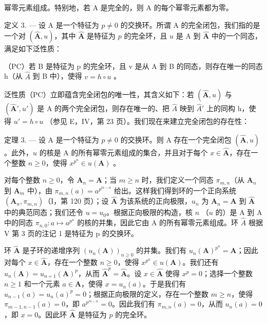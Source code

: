 幂零元素组成。特别地，若 A 是完全的，则 A 的每个幂零元素都为零。

定义 3. --- 设 A 是一个特征为 \(p \neq 0\) 的交换环。所谓 A 的完全闭包，我们指的是一个对 \((\hat{\mathbf{A}}, u)\)，其中 \(\hat{\mathbf{A}}\) 是特征为 \(p\) 的完全环，且 \(u\) 是 A 到 \(\hat{\mathbf{A}}\) 中的一个同态，满足如下泛性质：

（PC）若 B 是特征为 p 的完全环，且 v 是从 A 到 B 的同态，则存在唯一的同态 h（从 \(\hat{A}\) 到 B 中），使得 \(v = h \circ u\) 。

泛性质（PC）立即蕴含完全闭包的唯一性，其含义如下：若 \((\hat{\mathbf{A}}, u)\) 与 \((\hat{\mathbf{A}}', u')\) 是 A 的两个完全闭包，则存在唯一的、把 \(\hat{A}\) 映到 \(\hat{A}'\) 上的同构 h，使得 \(u' = h \circ u\) （参见 E，IV，第 23 页）。我们现在来建立完全闭包的存在性：

定理 3. --- 设 A 是一个特征为 \(p \neq 0\) 的交换环。则 A 存在一个完全闭包 \((\hat{\mathbf{A}}, u)\)。此外，\(u\) 的核是 A 的所有幂零元素组成的集合，并且对于每个 \(x \in \hat{\mathbf{A}}\)，存在一个整数 \(n \geqslant 0\)，使得 \(x^{p^n} \in u(\mathbf{A})\) 。

对每个整数 \(n \geqslant 0\)，令 \(\mathbf{A}_n = \mathbf{A}\)；当 \(m \geqslant n\) 时，我们定义一个同态 \(\pi_{m,n}\)（从 \(\mathbf{A}_n\) 到 \(\mathbf{A}_m\) 中），由 \(\pi_{m,n}(a) = a^{p^{m-n}}\) 给出。这样我们得到环的一个正向系统 \((\mathbf{A}_n, \pi_{m,n})\)（I，第 120 页）；设 \(\hat{\mathbf{A}}\) 为该系统的正向极限，\(u_n\) 为 \(\mathbf{A}_n = \mathbf{A}\) 到 \(\hat{\mathbf{A}}\) 中的典范同态；我们还令 \(u = u_0\)。根据正向极限的构造，核 \(n\) （\(u\) 的）是 A 到 A 中的同态 \(\pi_{n,0}: a \mapsto a^{p^n}\) 的核的并集，因此它由 A 的所有幂零元素组成。环 \(\hat{A}\) 根据 V 第 3 页的注记 1 是特征为 p 的交换环。

环 \(\hat{\mathbf{A}}\) 是子环的递增序列 \((u_n(\mathbf{A}))_{n\geq 0}\) 的并集。我们有 \(u_{n}(\mathbf{A})^{p^{n}} = \mathbf{A}\)；因此对每个 \(x\in \hat{\mathbf{A}}\)，存在一个整数 \(n\geqslant 0\)，使得 \(x^{p^n}\in u(\mathbf{A})\)。我们还有 \(u_{n}(\mathbf{A}) = u_{n + 1}(\mathbf{A})^{p}\)，从而 \(\hat{\mathbf{A}}^p = \hat{\mathbf{A}}\)。设 \(x\in \hat{\mathbf{A}}\) 使得 \(x^{p} = 0\)；选择一个整数 \(n\geqslant 1\) 和一个元素 \(a\in \mathbf{A}\)，使得 \(x = u_{n}(a)\)。于是我们有 \(u_{n - 1}(a) = u_n(a)^p = 0\)；根据正向极限的定义，存在一个整数 \(m\geqslant n\)，使得 \(\pi_{m - 1,n - 1}(a) = 0\)，即 \(a^{p^{m - n}} = 0\)。因此我们有 \(\pi_{m,n}(a) = 0\)，从而 \(u_{n}(a) = 0\)，即 \(x = 0\)。因此环 \(\hat{\mathbf{A}}\) 是特征为 \(p\) 的完全环。

